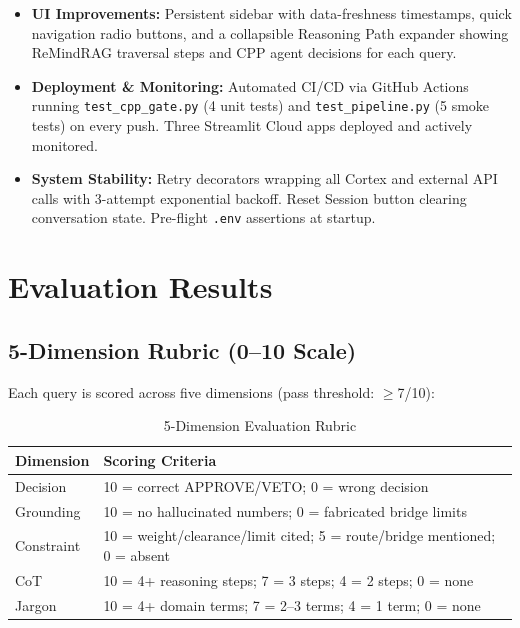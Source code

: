 \documentclass[11pt,letterpaper]{article}
\begin{document}
\begin{itemize}[nosep]
  \item \textbf{UI Improvements:} Persistent sidebar with data-freshness timestamps, quick navigation radio buttons, and a collapsible Reasoning Path expander showing ReMindRAG traversal steps and CPP agent decisions for each query.
  \item \textbf{Deployment \& Monitoring:} Automated CI/CD via GitHub Actions running \texttt{test\_cpp\_gate.py} (4 unit tests) and \texttt{test\_pipeline.py} (5 smoke tests) on every push. Three Streamlit Cloud apps deployed and actively monitored.
  \item \textbf{System Stability:} Retry decorators wrapping all Cortex and external API calls with 3-attempt exponential backoff. Reset Session button clearing conversation state. Pre-flight \texttt{.env} assertions at startup.
\end{itemize}

\section{Evaluation Results}

\subsection{5-Dimension Rubric (0--10 Scale)}
Each query is scored across five dimensions (pass threshold: $\geq$7/10):

\begin{table}[H]
\centering
\caption{5-Dimension Evaluation Rubric}
\label{tab:rubric}
\begin{tabular}{lp{8cm}}
\toprule
\textbf{Dimension} & \textbf{Scoring Criteria} \\
\midrule
Decision & 10 = correct APPROVE/VETO; 0 = wrong decision \\
Grounding & 10 = no hallucinated numbers; 0 = fabricated bridge limits \\
Constraint & 10 = weight/clearance/limit cited; 5 = route/bridge mentioned; 0 = absent \\
CoT & 10 = 4+ reasoning steps; 7 = 3 steps; 4 = 2 steps; 0 = none \\
Jargon & 10 = 4+ domain terms; 7 = 2--3 terms; 4 = 1 term; 0 = none \\
\bottomrule
\end{tabular}
\end{table}
\end{document}
